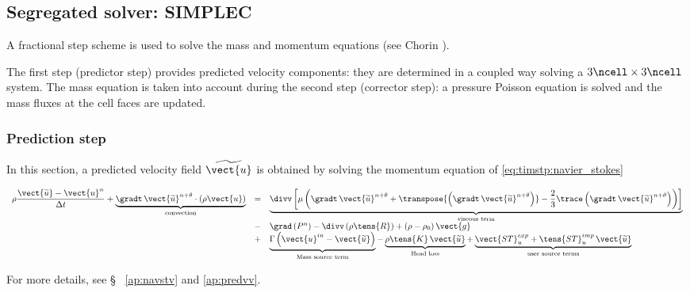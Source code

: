 \subsection{Segregated solver: SIMPLEC}
A fractional step scheme is used to solve the mass and momentum equations
(see Chorin \cite{Chorin:1968}).

The first step (predictor step) provides predicted velocity
components: they are determined in a coupled way solving a $3 \ncell \times 3 \ncell $ system.
The mass equation is taken into account during the second step
(corrector step): a pressure Poisson equation is solved and the mass fluxes
at the cell faces are updated.

\subsubsection{Prediction step}
In this section, a predicted velocity field $ \widetilde{\vect{u}} $ is obtained by solving
the momentum equation of \eqref{eq:timstp:navier_stokes}

\begin{equation}\label{eq:timstp:prediction}
\begin{array}{rcl}
\displaystyle \rho \dfrac{ \vect{\widetilde{u}} - \vect{u}^{n} } { \Delta t}
+
\underbrace {
\gradt \,  \vect{\widetilde{u}}^{n+\theta} \cdot \left( \rho\vect{u} \right)
}_{
\text{convection}
}%
&= & \underbrace{
\divv \left[ \mu \left( \gradt \, \vect{\widetilde{u}}^{n+\theta}
          + \transpose{\left(\gradt \, \vect{\widetilde{u}}^{n+\theta}\right)}
          - \frac{2}{3} \trace \left( \gradt \, \vect{\widetilde{u}}^{n+\theta}  \right)\right)\right]
}_{
\text{viscous term}
}%
\\
 &-& \grad \left( P^n \right)
 - \divv \left( \rho \tens{R} \right)
 + \left( \rho -\rho_0 \right) \vect{g} \\
&\displaystyle +&
\underbrace{
\Gamma \left( \vect{u}^{in}-\vect{\widetilde{u}} \right)
}_{
\text{Mass source term}
}%
-
\underbrace{
\rho \tens{K} \, \vect{\widetilde{u}}
}_{
\text{Head loss}
}%
 +
\underbrace{
\vect{ST}_{u}^{exp}+ \tens{ST}_{u}^{imp}\, \vect{\widetilde{u}}
}_{
\text{user source terms}
}%
\end{array}
\end{equation}

For more details, see \S~ \ref{ap:navstv} and \ref{ap:predvv}.


